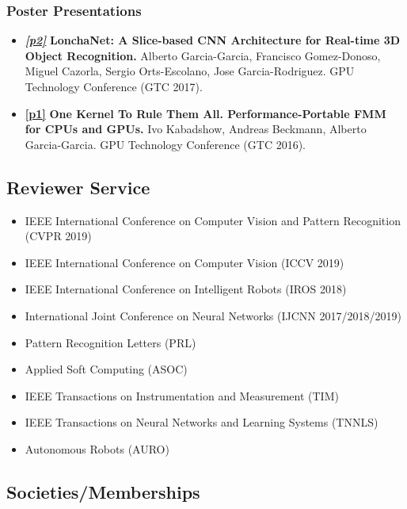 \documentclass[8pt]{article}
\begin{document}
\subsubsection*{Poster Presentations}

\begin{itemize}
    \item \emph{\textbf{\href{http://www.gputechconf.com/resources/poster-gallery/2017/deep-learning-artificial-intelligence}{[p2]}}} \textbf{LonchaNet: A Slice-based CNN Architecture for Real-time 3D Object Recognition.} Alberto Garcia-Garcia, Francisco Gomez-Donoso, Miguel Cazorla, Sergio Orts-Escolano, Jose Garcia-Rodriguez. GPU Technology Conference (GTC 2017).
    \item \emph{}{\href{http://www.gputechconf.com/resources/poster-gallery/2016/algorithms}{\textbf{[p1]}}} \textbf{One Kernel To Rule Them All. Performance-Portable FMM for CPUs and GPUs.} Ivo Kabadshow, Andreas Beckmann, Alberto Garcia-Garcia. GPU Technology Conference (GTC 2016).
\end{itemize}

\subsection*{Reviewer Service}

\begin{itemize}
	\item IEEE International Conference on Computer Vision and Pattern Recognition (CVPR 2019)
	\item IEEE International Conference on Computer Vision (ICCV 2019)
	\item IEEE International Conference on Intelligent Robots (IROS 2018)
	\item International Joint Conference on Neural Networks (IJCNN 2017/2018/2019)
	\item Pattern Recognition Letters (PRL)
	\item Applied Soft Computing (ASOC)
    \item IEEE Transactions on Instrumentation and Measurement (TIM)
    \item IEEE Transactions on Neural Networks and Learning Systems (TNNLS)
    \item Autonomous Robots (AURO)
\end{itemize}

\subsection*{Societies/Memberships}
\end{document}
